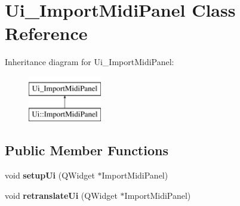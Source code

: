 \hypertarget{class_ui___import_midi_panel}{}\section{Ui\+\_\+\+Import\+Midi\+Panel Class Reference}
\label{class_ui___import_midi_panel}
Inheritance diagram for Ui\+\_\+\+Import\+Midi\+Panel\+:\begin{figure}[H]
\begin{center}
\leavevmode
\includegraphics[height=2.000000cm]{class_ui___import_midi_panel}
\end{center}
\end{figure}
\subsection*{Public Member Functions}
\begin{DoxyCompactItemize}
\item 
\mbox{\label{class_ui___import_midi_panel_a4ebd566cd56205e6ce300454a4558dcd}} 
void {\bfseries setup\+Ui} (Q\+Widget $\ast$Import\+Midi\+Panel)
\item 
\mbox{\label{class_ui___import_midi_panel_a0462170515247bf91a5cd5de02f3b648}} 
void {\bfseries retranslate\+Ui} (Q\+Widget $\ast$Import\+Midi\+Panel)
\end{DoxyCompactItemize}
